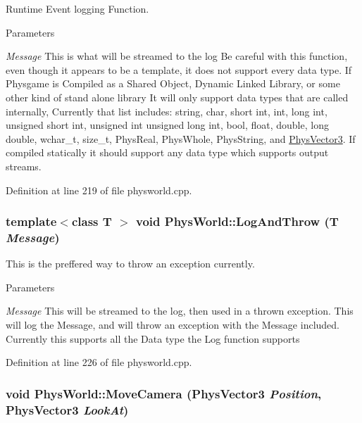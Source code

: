 Runtime Event logging Function. 
\begin{DoxyParams}{Parameters}
\item[{\em Message}]This is what will be streamed to the log Be careful with this function, even though it appears to be a template, it does not support every data type. If Physgame is Compiled as a Shared Object, Dynamic Linked Library, or some other kind of stand alone library It will only support data types that are called internally, Currently that list includes: string, char, short int, int, long int, unsigned short int, unsigned int unsigned long int, bool, float, double, long double, wchar\_\-t, size\_\-t, PhysReal, PhysWhole, PhysString, and \hyperlink{classPhysVector3}{PhysVector3}. If compiled statically it should support any data type which supports output streams. \end{DoxyParams}


Definition at line 219 of file physworld.cpp.\hypertarget{classPhysWorld_a1c2aeaed2a89821a4545db854da33ab8}{
\subsubsection[{LogAndThrow}]{\setlength{\rightskip}{0pt plus 5cm}template$<$class T $>$ void PhysWorld::LogAndThrow (T {\em Message})}}
\label{db/df5/classPhysWorld_a1c2aeaed2a89821a4545db854da33ab8}


This is the preffered way to throw an exception currently. 
\begin{DoxyParams}{Parameters}
\item[{\em Message}]This will be streamed to the log, then used in a thrown exception. This will log the Message, and will throw an exception with the Message included. Currently this supports all the Data type the Log function supports \end{DoxyParams}


Definition at line 226 of file physworld.cpp.\hypertarget{classPhysWorld_a1df24ee06d5881825902b60e0d81174a}{
\subsubsection[{MoveCamera}]{\setlength{\rightskip}{0pt plus 5cm}void PhysWorld::MoveCamera ({\bf PhysVector3} {\em Position}, \/  {\bf PhysVector3} {\em LookAt})}}
\label{db/df5/classPhysWorld_a1df24ee06d5881825902b60e0d81174a}


